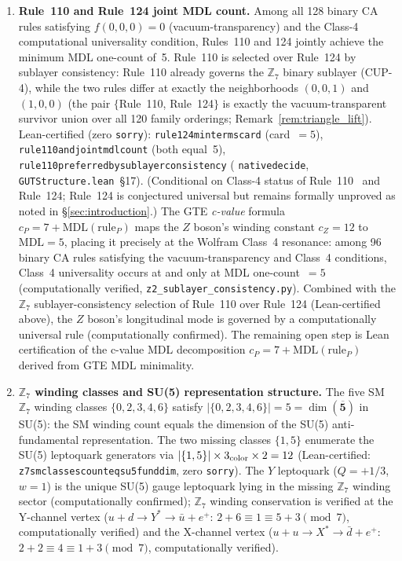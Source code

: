 \documentclass[11pt]{article}
\theoremstyle{remark}
\newcommand{\lean}[1]{%
  \penalty-100
  \begingroup\def\_{\textunderscore\allowbreak}\texttt{#1}\endgroup}
\begin{document}
\begin{enumerate}
\item \textbf{Rule~110 and Rule~124 joint MDL count.}
Among all 128 binary CA rules satisfying $f(0,0,0)=0$ (vacuum-transparency) and the
Class-4 computational universality condition, Rules~110 and 124 jointly achieve the
minimum MDL one-count of~5.
Rule~110 is selected over Rule~124 by sublayer consistency: Rule~110 already governs
the $\mathbb{Z}_7$ binary sublayer (CUP-4), while the two rules differ at exactly the
neighborhoods $(0,0,1)$ and $(1,0,0)$
(the pair $\{$Rule~110, Rule~124$\}$ is exactly the vacuum-transparent survivor union
over all 120 family orderings; Remark~\ref{rem:triangle_lift}).
Lean-certified (zero \texttt{sorry}): \lean{rule124\_minterms\_card}
(card~$= 5$), \lean{rule110\_and\_124\_joint\_mdl\_count} (both equal~5),
\lean{rule110\_preferred\_by\_sublayer\_consistency}
(\lean{native\_decide}, \lean{GUTStructure.lean}~\S17).
(Conditional on Class-4 status of Rule~110~\cite{Cook2004,Cook2009} and Rule~124;
Rule~124 is conjectured universal but remains formally unproved as noted in \S\ref{sec:introduction}.)
The GTE \emph{c-value} formula $c_P = 7 + \mathrm{MDL}(\text{rule}_P)$ maps the $Z$ boson's
winding constant $c_Z = 12$ to $\mathrm{MDL} = 5$, placing it precisely at the
Wolfram Class~4 resonance: among 96 binary CA rules satisfying the vacuum-transparency
and Class~4 conditions, Class~4 universality occurs at and only at MDL one-count~$= 5$
(computationally verified, \texttt{z2\_sublayer\_consistency.py}).
Combined with the $\mathbb{Z}_7$ sublayer-consistency selection of Rule~110 over Rule~124
(Lean-certified above), the $Z$ boson's longitudinal mode is governed by a computationally
universal rule (computationally confirmed).
The remaining open step is Lean certification of the c-value MDL decomposition
$c_P = 7 + \mathrm{MDL}(\text{rule}_P)$ derived from GTE MDL minimality.

\item \textbf{$\mathbb{Z}_7$ winding classes and SU(5) representation structure.}
The five SM $\mathbb{Z}_7$ winding classes $\{0,2,3,4,6\}$ satisfy
$|\{0,2,3,4,6\}| = 5 = \dim(\overline{\mathbf{5}})$ in SU(5):
the SM winding count equals the dimension of the SU(5) anti-fundamental representation.
The two missing classes $\{1,5\}$ enumerate the SU(5) leptoquark generators via
$|\{1,5\}| \times 3_{\rm color} \times 2 = 12$
(Lean-certified: \lean{z7\_sm\_classes\_count\_eq\_su5\_fund\_dim}, zero \texttt{sorry}).
The $Y$ leptoquark ($Q = +1/3$, $w = 1$) is the unique SU(5) gauge leptoquark
lying in the missing $\mathbb{Z}_7$ winding sector (computationally confirmed);
$\mathbb{Z}_7$ winding conservation is verified at the Y-channel vertex
($u + d \to Y^* \to \bar{u} + e^+$: $2+6 \equiv 1 \equiv 5+3 \pmod{7}$, computationally verified)
and the X-channel vertex ($u + u \to X^* \to \bar{d} + e^+$: $2+2 \equiv 4 \equiv 1+3 \pmod{7}$, computationally verified).


\end{enumerate}
\end{document}
